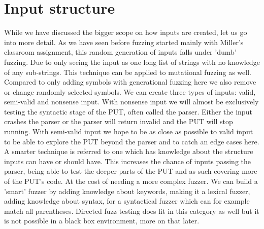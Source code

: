 \section{Input structure}
While we have discussed the bigger scope on how inputs are created, let us go into more detail. As we have seen before fuzzing started mainly with Miller's classroom assignment, this random generation of inputs falls under 'dumb' fuzzing. Due to only seeing the input as one long list of strings with no knowledge of any sub-strings. This technique can be applied to mutational fuzzing as well. Compared to only adding symbols with generational fuzzing here we also remove or change randomly selected symbols. 
We can create three types of inputs: valid, semi-valid and nonsense input. With nonsense input we will almost be exclusively testing the syntactic stage of the PUT, often called the parser. Either the input crashes the parser or the parser will return invalid and the PUT will stop running. With semi-valid input we hope to be as close as possible to valid input to be able to explore the PUT beyond the parser and to catch an edge cases here.
A smarter technique is referred to one which has knowledge about the structure inputs can have or should have. This increases the chance of inputs passing the parser, being able to test the deeper parts of the PUT and as such covering more of the PUT's code. At the cost of needing a more complex fuzzer. We can build a 'smart' fuzzer by adding knowledge about keywords, making it a lexical fuzzer, adding knowledge about syntax, for a syntactical fuzzer which can for example match all parentheses. Directed fuzz testing does fit in this category as well but it is not possible in a black box environment, more on that later.

